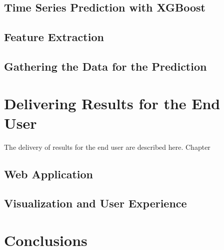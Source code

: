 \documentclass{article}
\begin{document}

\subsection{Time Series Prediction with XGBoost}
\label{subsection:xgboost}




\subsection{Feature Extraction}
\label{subsection:extraction}

\subsection{Gathering the Data for the Prediction}
\label{subsection:datafilling}


\section{Delivering Results for the End User}
\label{section:delivery}

The delivery of results for the end user are described here. Chapter 

\subsection{Web Application}
\label{subsection:server}

\subsection{Visualization and User Experience}
\label{subsection:ux}


\section{Conclusions}
\label{section:conclusions}

\end{document}
